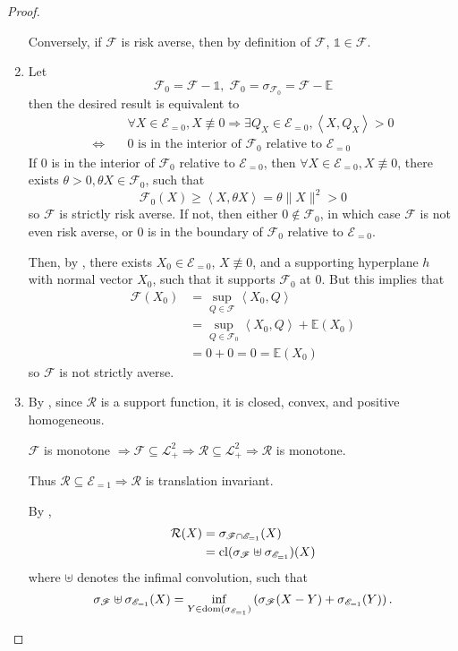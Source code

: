 \begin{proof}
\begin{enumerate}[(1)]
	Conversely, if $\mathcal{F}$ is risk averse, then by definition of $\mathscr{F}$, $\mathds{1}\in\mathscr{F}$.
	\item
	Let 
	$$\mathscr{F}_0 = \mathscr{F}-\mathds{1}, \; \mathcal{F}_0 = \sigma_{\mathscr{F}_0} = \mathcal{F} - \mathbb{E}$$
	then the desired result is equivalent to 
	$$
	\begin{aligned}
	& \forall X \in \mathscr{E}_{=0}, X \not\equiv 0 \Rightarrow \exists Q_X\in\mathscr{E}_{=0}, \left< X, Q_X\right> > 0 \\
	\Leftrightarrow \quad & 0 \text{ is in the interior of }\mathscr{F}_0 \text{ relative to }\mathscr{E}_{=0}
	\end{aligned}
	$$
	If $0$ is in the interior of $\mathscr{F}_0$ relative to $\mathscr{E}_{=0}$, then $\forall X\in \mathscr{E}_{=0}, X\not\equiv 0$, there exists $\theta > 0, \theta X \in \mathscr{F}_0$, such that 
	$$\mathcal{F}_0(X) \ge \left< X , \theta X \right> = \theta \|X\|^2 > 0$$
	so $\mathcal{F}$ is strictly risk averse.
	If not, then either $0\not\in \mathscr{F}_0$, in which case $\mathcal{F}$ is not even risk averse, or  $0$ is in the boundary of $\mathscr{F}_0$ relative to $\mathscr{E}_{=0}$. 
	
	Then, by \cite[Lemma 4.2.1]{hiriart-urrutyFundamentalsConvexAnalysis2001}, there exists $X_0\in \mathscr{E}_{=0}$,  $X\not \equiv 0$, and a supporting hyperplane $h$ with normal vector $X_0$, such that it supports $\mathscr{F}_0$ at $0$. But this implies that 
	$$
	\begin{aligned}
	 \mathcal{F}(X_0) &= \sup_{Q \in \mathscr{F}} \left<X_0, Q \right> \\
	&= \sup_{Q \in \mathscr{F}_0} \left<X_0, Q \right> + \mathbb{E}(X_0)\\
	&= 0 + 0 = 0 = \mathbb{E}(X_0)
	\end{aligned}
	$$
	so $\mathcal{F}$ is not strictly averse.
	\item By \cite[Proposition 2.1.2]{hiriart-urrutyFundamentalsConvexAnalysis2001}, since $\mathcal{R}$ is a support function, it is closed, convex, and positive homogeneous. 
	
	$\mathcal{F}$ is monotone $\Rightarrow \mathscr{F} \subseteq \mathscr{L}_+^2 \Rightarrow \mathscr{R} \subseteq \mathscr{L}_+^2 \Rightarrow \mathcal{R}$ is monotone.
	
	Thus $\mathscr{R} \subseteq \mathscr{E}_{=1} \Rightarrow \mathcal{R}$ is translation invariant.
	
	By \cite[Equation 3.3.1]{hiriart-urrutyFundamentalsConvexAnalysis2001},
	$$
	\begin{aligned}
	\mathcal{R}(X) &= \sigma_{\mathscr{F}\cap \mathscr{E}_{=1}}(X) \\
	&= \operatorname*{cl}(\sigma_{\mathscr{F}}\uplus \sigma_{\mathscr{E}_{=1}})(X) \\
	\end{aligned}
	$$
	where $\uplus$ denotes the infimal convolution, such that 
	$$\sigma_{\mathscr{F}}\uplus \sigma_{\mathscr{E}_{=1}}(X) = \inf_{Y\in\operatorname*{dom}(\sigma_{\mathscr{E}_{=1}})}
	\left(
	\sigma_{\mathscr{F}}(X-Y) + \sigma_{\mathscr{E}_{=1}}(Y)
	\right).$$
	

\end{enumerate}
\end{proof}
